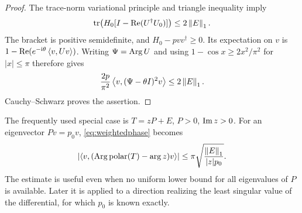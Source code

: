 \begin{proof}
The trace-norm variational principle and triangle inequality imply
\[
 \operatorname{tr}\bigl(H_0[I-\operatorname{Re}(U^\dagger U_0)]\bigr)\leq2\left\lVert E\right\rVert_1.
\]
The bracket is positive semidefinite, and
$H_0-pvv^\dagger\geq0$. Its expectation on $v$ is
$1-\operatorname{Re}(e^{-\mathrm i\theta}\left\langle v,Uv\right\rangle)$.
Writing $\Psi=\operatorname{Arg} U$ and using
$1-\cos x\geq2x^2/\pi^2$ for $|x|\leq\pi$ therefore gives
\[
 \frac{2p}{\pi^2}\left\langle v,(\Psi-\theta I)^2v\right\rangle
 \leq2\left\lVert E\right\rVert_1.
\]
Cauchy--Schwarz proves the assertion.
\end{proof}

The frequently used special case is $T=zP+E$, $P>0$, $\operatorname{Im} z>0$.
For an eigenvector $Pv=p_0v$, \eqref{eq:weightedphase} becomes
\begin{equation}\label{eq:weightedscalar}
 \left|\left\langle v,(\operatorname{Arg}\operatorname{polar}(T)-\arg z)v\right\rangle\right|
 \leq\pi\sqrt{\frac{\left\lVert E\right\rVert_1}{|z|p_0}}.
\end{equation}
The estimate is useful even when no uniform lower bound for all
eigenvalues of $P$ is available. Later it is applied to a direction
realizing the least singular value of the differential, for which
$p_0$ is known exactly.
